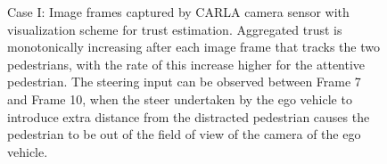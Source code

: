 \documentclass[journal]{IEEEtran}
\begin{document}
\begin{figure}
    \centering
    \hfill
    \hfill
    \hfill
    \caption{Case I: Image frames captured by CARLA camera sensor with visualization scheme for trust estimation. Aggregated trust is monotonically increasing after each image frame that tracks the two pedestrians, with the rate of this increase higher for the attentive pedestrian. The steering input can be observed between Frame 7 and Frame 10, when the steer undertaken by the ego vehicle to introduce extra distance from the distracted pedestrian causes the pedestrian to be out of the field of view of the camera of the ego vehicle. }\label{trust_frames}
  \end{figure}
\end{document}
